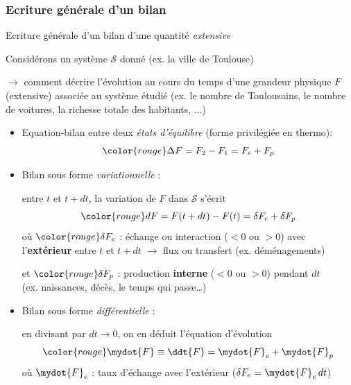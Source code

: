 \subsubsection{Ecriture générale d'un bilan}
\begin{frame}{Ecriture générale d'un bilan d'une quantité {\em extensive}}

\small

Considérons un système $\mathcal{S}$ donné (ex. la ville de Toulouse)

\smallskip

$\rightarrow$ comment décrire l'évolution au cours du temps d'une grandeur physique $F$ (extensive) \mytabbing{$\rightarrow$}
associée au système étudié (ex. le nombre de Toulousains, le nombre de voitures, la richesse totale des habitants, ...)
\bigskip

\begin{minipage}{100mm}

\begin{itemize}


\item<2->
	Equation-bilan entre deux {\em états d'équilibre} (forme privilégiée en thermo):
		\[
		\color{rouge} \Delta F = F_2 - F_1 = F_e+ F_p
	\]
\item<3->
	Bilan sous forme \textsl{variationnelle} :
	
	entre $t$ et $t+dt$, la variation de $F$ dans $\mathcal{S}$ s'écrit
	\[
		\color{rouge} dF = F(t+dt) - F(t) = \delta F_e+ \delta F_p
	\]
	où $\color{rouge} \delta F_e$ : échange ou \textcolor{vert}{interaction} ($<0$ ou $>0$) 
	avec l'\textbf{extérieur} entre $t$ et $t+dt$ \quad
	$\rightarrow$ flux ou transfert (ex. déménagements)
		
	\smallskip
	et $\color{rouge} \delta F_p$ : \textcolor{vert}{production} \textbf{interne} ($<0$ ou $>0$) pendant $dt$ \\
	(ex. naissances, décès, le temps qui passe\ldots) 

\smallskip
\item<4->

	Bilan sous forme \textsl{différentielle} :

	en divisant par $dt\rightarrow 0$, on en déduit l'équation d'évolution
  $$\color{rouge} \mydot{F} \equiv \ddt{F} = \mydot{F}_e + \mydot{F}_p$$
  	où $\mydot{F}_e$ : \textcolor{vert}{taux d'échange} avec l'extérieur 
	($\delta F_e = \mydot{F}_e\, dt$)
		

\end{itemize}
\end{minipage}
\end{frame}
